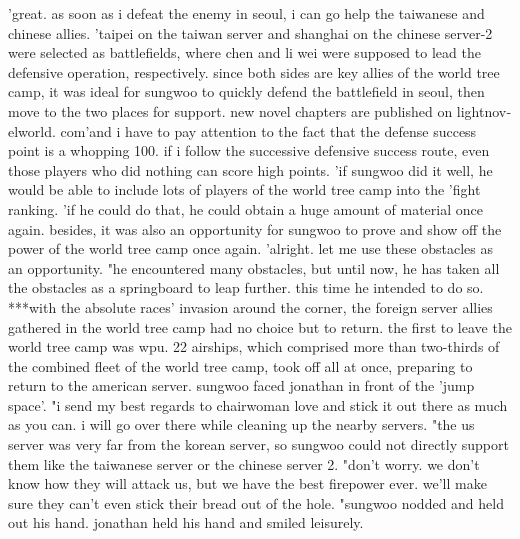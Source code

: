 'great.
 as soon as i defeat the enemy in seoul, i can go help the taiwanese and chinese allies.
'taipei on the taiwan server and shanghai on the chinese server-2 were selected as battlefields, where chen and li wei were supposed to lead the defensive operation, respectively.
 since both sides are key allies of the world tree camp, it was ideal for sungwoo to quickly defend the battlefield in seoul, then move to the two places for support.
new novel chapters are published on lightnov­elworld.
com'and i have to pay attention to the fact that the defense success point is a whopping 100.
 if i follow the successive defensive success route, even those players who did nothing can score high points.
'if sungwoo did it well, he would be able to include lots of players of the world tree camp into the 'fight ranking.
'if he could do that, he could obtain a huge amount of material once again.
 besides, it was also an opportunity for sungwoo to prove and show off the power of the world tree camp once again.
'alright.
 let me use these obstacles as an opportunity.
"he encountered many obstacles, but until now, he has taken all the obstacles as a springboard to leap further.
 this time he intended to do so.
***with the absolute races' invasion around the corner, the foreign server allies gathered in the world tree camp had no choice but to return.
the first to leave the world tree camp was wpu.
 22 airships, which comprised more than two-thirds of the combined fleet of the world tree camp, took off all at once, preparing to return to the american server.
sungwoo faced jonathan in front of the 'jump space'.
"i send my best regards to chairwoman love and stick it out there as much as you can.
 i will go over there while cleaning up the nearby servers.
"the us server was very far from the korean server, so sungwoo could not directly support them like the taiwanese server or the chinese server 2.
"don't worry.
 we don't know how they will attack us, but we have the best firepower ever.
 we'll make sure they can't even stick their bread out of the hole.
"sungwoo nodded and held out his hand.
 jonathan held his hand and smiled leisurely.

